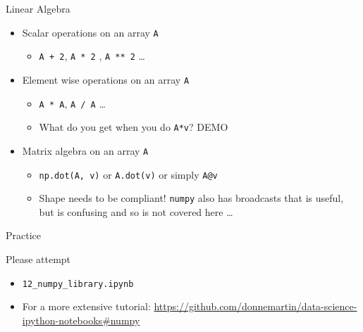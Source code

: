 \documentclass[presentation]{beamer}
\begin{document}
\begin{frame}[label={sec:org3b90a47},fragile]{Linear Algebra}

\begin{itemize}
\item Scalar operations on an array \texttt{A}
\begin{itemize}
\item \texttt{A + 2}, \texttt{A * 2} , \texttt{A ** 2} \ldots{}
\end{itemize}
\item Element wise operations on an array \texttt{A}
\begin{itemize}
\item \texttt{A * A}, \texttt{A / A} \ldots{}
\item What do you get when you do \texttt{A*v}? \alert{DEMO}
\end{itemize}
\item Matrix algebra on an array \texttt{A}
\begin{itemize}
\item \texttt{np.dot(A, v)} or \texttt{A.dot(v)} or simply \texttt{A@v}
\item Shape needs to be compliant! \texttt{numpy} also has broadcasts that is useful,
but is confusing and so is not covered here \ldots{}
\end{itemize}
\end{itemize}
\end{frame}

\begin{frame}[label={sec:orgebf8dcf},fragile]{Practice}
 \begin{block}{Please attempt}
\begin{itemize}
\item \texttt{12\_numpy\_library.ipynb}
\item For a more extensive tutorial: \url{https://github.com/donnemartin/data-science-ipython-notebooks\#numpy}
\end{itemize}
\end{block}
\end{frame}
\end{document}
